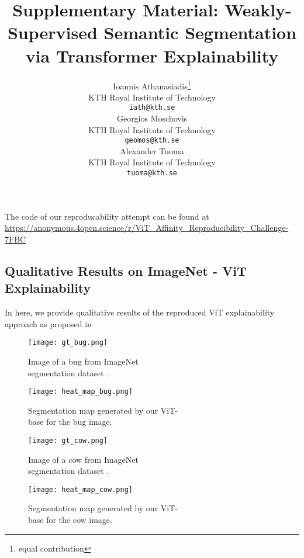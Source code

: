 \documentclass{article}
\title{Supplementary Material: Weakly-Supervised Semantic Segmentation via Transformer Explainability}
\author{
Ioannis Athanasiadis\thanks{equal contribution} \\
KTH Royal Institute of Technology \\
\texttt{iath@kth.se} \\
\AND
Georgios Moschovis\printfnsymbol{1} \\
KTH Royal Institute of Technology \\
\texttt{geomos@kth.se} \\
\And
Alexander Tuoma \\
KTH Royal Institute of Technology \\
\texttt{tuoma@kth.se} \\
}
\begin{document}
\maketitle
The code of our reproducability attempt can be found at \url{https://anonymous.4open.science/r/ViT_Affinity_Reproducibility_Challenge-7FBC}

\subsection*{Qualitative Results on ImageNet - ViT Explainability \cite{mainpaper}}
\label{ImageNet_results}
In here, we provide qualitative results of the reproduced ViT explainability approach as proposed in \cite{mainpaper}

\begin{figure}[H]
  \texttt{[image: gt\_bug.png]}
  \caption{Image of a bug from ImageNet \\segmentation dataset \cite{imagenet-seg}.}\label{fig:gt_bug}
\endminipage\hfill
{}
  \texttt{[image: heat\_map\_bug.png]}
  \caption{Segmentation map generated by our ViT- \\base for the bug image.}\label{fig:map_bug}
\endminipage\hfill
\end{figure}

\begin{figure}[H]
  \texttt{[image: gt\_cow.png]}
  \caption{Image of a cow from ImageNet \\segmentation dataset \cite{imagenet-seg}.}\label{fig:gt_cow}
\endminipage\hfill
{}
  \texttt{[image: heat\_map\_cow.png]}
  \caption{Segmentation map generated by our ViT- \\base for the cow image.}\label{fig:map_cow}
\endminipage\hfill
\end{figure}

\end{document}
